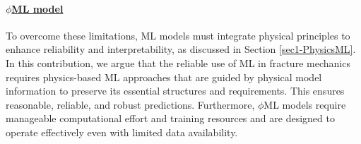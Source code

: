 \documentclass[final,3p,times]{elsarticle}
\begin{document}
\paragraph*{\underline{\textbf{$\phi$ML model}}}
%
To overcome these limitations, ML models must integrate physical principles to enhance reliability and interpretability, as discussed in Section \ref{sec1-PhysicsML}. In this contribution, we argue that the reliable use of ML in fracture mechanics requires physics-based ML approaches that are guided by physical model information to preserve its essential structures and requirements. This ensures reasonable, reliable, and robust predictions. Furthermore, $\phi$ML models require manageable computational effort and training resources and are designed to operate effectively even with limited data availability. 
\end{document}

